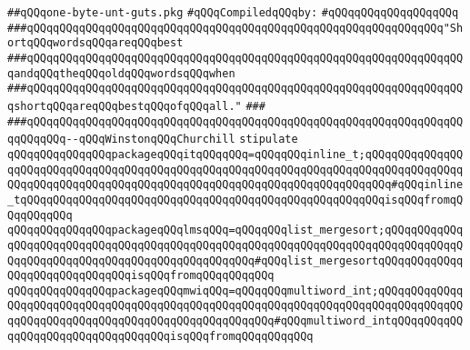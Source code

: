 \label{src/lib/std/src/one-byte-unt-guts.pkg}
\verb|##qQQqone-byte-unt-guts.pkg|\newline
\newline
\verb|#qQQqCompiledqQQqby:|\newline
\verb|#qQQqqQQqqQQqqQQqqQQq|\newline
\newline
\newline
\newline
\verb|###qQQqqQQqqQQqqQQqqQQqqQQqqQQqqQQqqQQqqQQqqQQqqQQqqQQqqQQqqQQqqQQq"ShortqQQqwordsqQQqareqQQqbest|\newline
\verb|###qQQqqQQqqQQqqQQqqQQqqQQqqQQqqQQqqQQqqQQqqQQqqQQqqQQqqQQqqQQqqQQqqQQqandqQQqtheqQQqoldqQQqwordsqQQqwhen|\newline
\verb|###qQQqqQQqqQQqqQQqqQQqqQQqqQQqqQQqqQQqqQQqqQQqqQQqqQQqqQQqqQQqqQQqqQQqshortqQQqareqQQqbestqQQqofqQQqall."|\newline
\verb|###|\newline
\verb|###qQQqqQQqqQQqqQQqqQQqqQQqqQQqqQQqqQQqqQQqqQQqqQQqqQQqqQQqqQQqqQQqqQQqqQQqqQQq--qQQqWinstonqQQqChurchill|\newline
\newline
\newline
\newline
\verb|stipulate|\newline
\verb|qQQqqQQqqQQqqQQqpackageqQQqitqQQqqQQq=qQQqqQQqinline_t;qQQqqQQqqQQqqQQqqQQqqQQqqQQqqQQqqQQqqQQqqQQqqQQqqQQqqQQqqQQqqQQqqQQqqQQqqQQqqQQqqQQqqQQqqQQqqQQqqQQqqQQqqQQqqQQqqQQqqQQqqQQqqQQqqQQqqQQqqQQqqQQq#qQQqinline_tqQQqqQQqqQQqqQQqqQQqqQQqqQQqqQQqqQQqqQQqqQQqqQQqqQQqqQQqisqQQqfromqQQqqQQqqQQq|\newline
\verb|qQQqqQQqqQQqqQQqpackageqQQqlmsqQQq=qQQqqQQqlist_mergesort;qQQqqQQqqQQqqQQqqQQqqQQqqQQqqQQqqQQqqQQqqQQqqQQqqQQqqQQqqQQqqQQqqQQqqQQqqQQqqQQqqQQqqQQqqQQqqQQqqQQqqQQqqQQqqQQqqQQqqQQq#qQQqlist_mergesortqQQqqQQqqQQqqQQqqQQqqQQqqQQqqQQqisqQQqfromqQQqqQQqqQQq|\newline
\verb|qQQqqQQqqQQqqQQqpackageqQQqmwiqQQq=qQQqqQQqmultiword_int;qQQqqQQqqQQqqQQqqQQqqQQqqQQqqQQqqQQqqQQqqQQqqQQqqQQqqQQqqQQqqQQqqQQqqQQqqQQqqQQqqQQqqQQqqQQqqQQqqQQqqQQqqQQqqQQqqQQqqQQqqQQq#qQQqmultiword_intqQQqqQQqqQQqqQQqqQQqqQQqqQQqqQQqqQQqisqQQqfromqQQqqQQqqQQq|\newline
